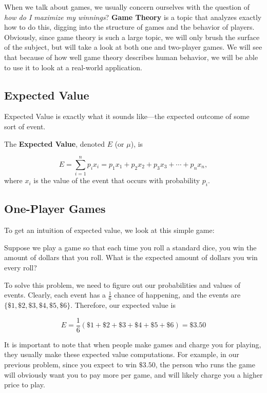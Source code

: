 When we talk about games, we usually concern ourselves with the question of \textit{how do I maximize my winnings}? \textbf{Game Theory} is a topic that analyzes exactly how to do this, digging into the structure of games and the behavior of players. Obviously, since game theory is such a large topic, we will only brush the surface of the subject, but will take a look at both one and two-player games. We will see that because of how well game theory describes human behavior, we will be able to use it to look at a real-world application.


\subsection{Expected Value}
Expected Value is exactly what it sounds like---the expected outcome of some sort of event.

\begin{definition}
The \textbf{Expected Value}, denoted $E$ (or $\mu$), is 

\begin{equation}
    E = \sum\limits_{i=1}^{n} p_i x_i = p_1x_1+p_2x_2+p_3x_3+\cdots+p_nx_n,
\end{equation}
where $x_i$ is the value of the event that occurs with probability $p_i$.
\end{definition}

\subsection{One-Player Games}
To get an intuition of expected value, we look at this simple game:

\begin{problem}
Suppose we play a game so that each time you roll a standard dice, you win the amount of dollars that you roll. What is the expected amount of dollars you win every roll?
\end{problem}

To solve this problem, we need to figure out our probabilities and values of events. Clearly, each event has a $\frac{1}{6}$ chance of happening, and the events are $\{\$1,\$2,\$3,\$4,\$5,\$6\}$. Therefore, our expected value is

$$E = \frac{1}{6}(\$1+\$2+\$3+\$4+\$5+\$6)=\boxed{\$3.50}$$

It is important to note that when people make games and charge you for playing, they usually make these expected value computations. For example, in our previous problem, since you expect to win $\$3.50$, the person who runs the game will obviously want you to pay more per game, and will likely charge you a higher price to play. 

